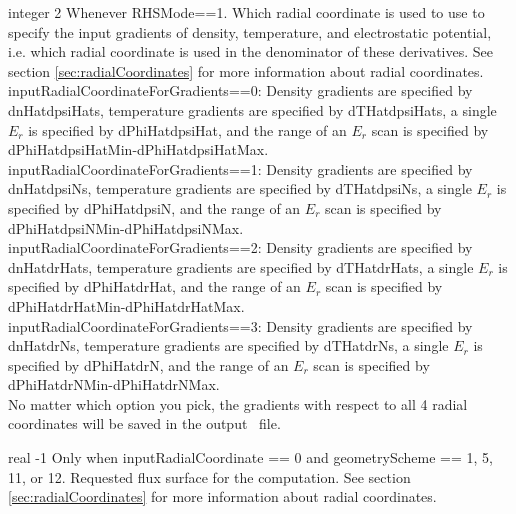 {integer}
{2}
{Whenever {\ttfamily RHSMode}==1.}
{Which radial coordinate is used to use to specify the input gradients of density, temperature, and electrostatic potential,
i.e. which radial coordinate is used in the denominator of these derivatives.
See section \ref{sec:radialCoordinates}
for more information about radial coordinates.\\

{\ttfamily inputRadialCoordinateForGradients}==0: Density gradients are specified by {\ttfamily dnHatdpsiHats},
temperature gradients are specified by {\ttfamily dTHatdpsiHats}, a single $E_r$ is specified by {\ttfamily dPhiHatdpsiHat},
and the range of an $E_r$ scan is specified by {\ttfamily dPhiHatdpsiHatMin-dPhiHatdpsiHatMax}.\\

{\ttfamily inputRadialCoordinateForGradients}==1: Density gradients are specified by {\ttfamily dnHatdpsiNs},
temperature gradients are specified by {\ttfamily dTHatdpsiNs}, a single $E_r$ is specified by {\ttfamily dPhiHatdpsiN},
and the range of an $E_r$ scan is specified by {\ttfamily dPhiHatdpsiNMin-dPhiHatdpsiNMax}.\\

{\ttfamily inputRadialCoordinateForGradients}==2: Density gradients are specified by {\ttfamily dnHatdrHats},
temperature gradients are specified by {\ttfamily dTHatdrHats}, a single $E_r$ is specified by {\ttfamily dPhiHatdrHat},
and the range of an $E_r$ scan is specified by {\ttfamily dPhiHatdrHatMin-dPhiHatdrHatMax}.\\

{\ttfamily inputRadialCoordinateForGradients}==3: Density gradients are specified by {\ttfamily dnHatdrNs},
temperature gradients are specified by {\ttfamily dTHatdrNs}, a single $E_r$ is specified by {\ttfamily dPhiHatdrN},
and the range of an $E_r$ scan is specified by {\ttfamily dPhiHatdrNMin-dPhiHatdrNMax}.\\

No matter which option you pick, the gradients with respect to all 4 radial coordinates will be saved in the output \HDF~file.
}

\myhrule

{real}
{-1}
{Only when {\ttfamily inputRadialCoordinate} == 0 and {\ttfamily geometryScheme} == 1, 5, 11, or 12.}
{Requested flux surface for the computation.  See section \ref{sec:radialCoordinates}
for more information about radial coordinates.}

